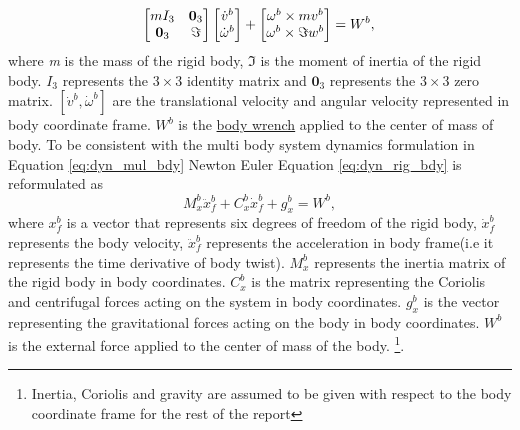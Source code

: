 \begin{equation}
\label{eq:dyn_rig_bdy}
\begin{bmatrix}
mI_3 & \textbf{0}_3 \\ \textbf{0}_3 &\Im
\end{bmatrix}
\begin{bmatrix}
\dot{v}^b\\ \dot{\omega}^b
\end{bmatrix}
+ \begin{bmatrix}
\omega^b \times mv^b \\ 
\omega^b \times \Im w^b
\end{bmatrix}
= W^b,\\
\end{equation}
where \emph{m} is the mass of the rigid body, $\Im$ is the moment of inertia of the rigid body. $I_3$ represents the $3 \times 3$ identity matrix and $ \textbf{0}_3$ represents the  $3 \times 3$ zero matrix. $[\dot{v}^b,\dot{\omega}^b]$ are the translational velocity and angular velocity represented in body coordinate frame. $W^b$ is the \underline{body wrench}  applied to the center of mass of body. To be consistent with the multi body system dynamics formulation in Equation \ref{eq:dyn_mul_bdy} Newton Euler Equation \ref{eq:dyn_rig_bdy} is reformulated as
\begin{equation}
\label{eq:dyn_rig_bdy_sh}
M_x^b \ddot{x}_f^b + C_x^b\dot{x}_f^b+g_x^b = W^b,
\end{equation}
 where $x_f^b$ is a vector that represents six degrees of freedom of the rigid body, $\dot{x}_f^b$ represents the body velocity, $\ddot{x}_f^b$ represents the acceleration in body frame(i.e it represents the time derivative of body twist). $M_x^b$ represents the inertia matrix of the rigid body in body coordinates. $C_x^b$ is the matrix representing the Coriolis and centrifugal forces acting on the system in body coordinates. $g_x^b$ is the vector representing the gravitational forces acting on the body in body coordinates. $W^b$ is the external force applied to the center of mass of the body. \footnote[2]{Inertia, Coriolis and gravity are assumed to be given with respect to the body coordinate frame for the rest of the report}.

